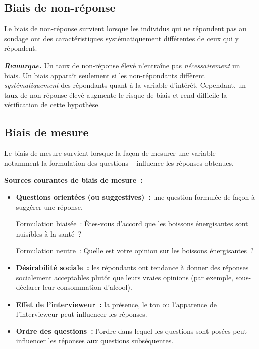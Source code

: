 \documentclass[11pt,french]{article}
\newcommand{\remarque}[1]{%
  \medskip\noindent\textit{\textbf{Remarque.}} #1\medskip}
\begin{document}
\subsection{Biais de non-réponse}

Le biais de non-réponse survient lorsque les individus qui ne répondent pas au sondage ont des
caractéristiques systématiquement différentes de ceux qui y répondent.

\remarque{Un taux de non-réponse élevé n'entraîne pas \emph{nécessairement} un biais. Un biais
apparaît seulement si les non-répondants diffèrent \emph{systématiquement} des répondants
quant à la variable d'intérêt. Cependant, un taux de non-réponse élevé augmente le risque de
biais et rend difficile la vérification de cette hypothèse.}

\subsection{Biais de mesure}

Le biais de mesure survient lorsque la façon de mesurer une variable -- notamment la formulation
des questions -- influence les réponses obtenues.

\textbf{Sources courantes de biais de mesure~:}
\begin{itemize}[itemsep=4pt]
  \item \textbf{Questions orientées (ou suggestives)~:} une question formulée de façon à
        suggérer une réponse.

        Formulation biaisée~: \og Êtes-vous d'accord que les boissons énergisantes sont
        nuisibles à la santé~? \fg

        Formulation neutre~: \og Quelle est votre opinion sur les boissons énergisantes~? \fg

  \item \textbf{Désirabilité sociale~:} les répondants ont tendance à donner des réponses
        socialement acceptables plutôt que leurs vraies opinions (par exemple, sous-déclarer
        leur consommation d'alcool).

  \item \textbf{Effet de l'intervieweur~:} la présence, le ton ou l'apparence de l'intervieweur
        peut influencer les réponses.

  \item \textbf{Ordre des questions~:} l'ordre dans lequel les questions sont posées peut
        influencer les réponses aux questions subséquentes.
\end{itemize}
\end{document}
